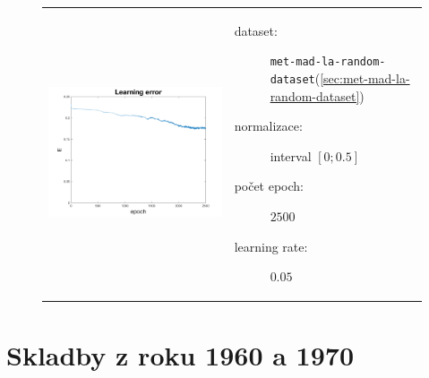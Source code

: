 \documentclass[thesis=M,czech]{FITthesis}[2012/06/26]
\begin{document}
\begin{figure}[htbp]
\begin{tabular}{p{}p{}}
    \begin{minipage}{.5\textwidth}
    \centering
    \includegraphics[scale=0.3]{err_met-mad-la-random.png}
    \label{fig:fig1}
    \end{minipage}
    &
    \begin{minipage}{.5\textwidth}
		\begin{description}
            \item[dataset:] \texttt{met-mad-la-random-dataset}(\ref{sec:met-mad-la-random-dataset})
            \item[normalizace:] interval $[0;0.5]$
            \item[počet epoch:] $2500$
            \item[learning rate:] $0.05$
        \end{description}
\end{minipage}
\end{tabular}
\end{figure}





\section{Skladby z roku 1960 a 1970}\label{exp:60-vs-70}
\end{document}
